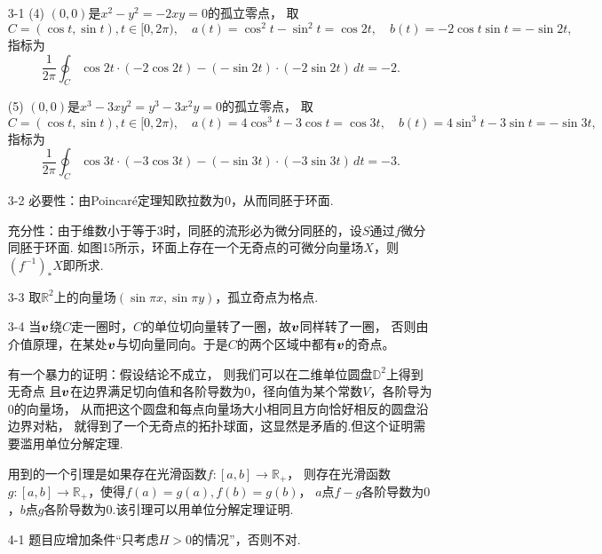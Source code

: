 \begin{itemize}
\item[3-1](4) $(0,0)$是$x^2-y^2=-2xy=0$的孤立零点，
取$$C=(\cos t,\sin t),t\in[0,2\pi),
\quad a(t)=\cos^2t-\sin^2t=\cos 2t,\quad b(t)=-2\cos t\sin t=-\sin 2t,$$指标为
$$\frac{1}{2\pi}\oint_C \cos 2t\cdot(-2\cos 2t)-(-\sin 2t)\cdot(-2\sin 2t)\,dt=-2.$$

(5) $(0,0)$是$x^3-3xy^2=y^3-3x^2y=0$的孤立零点，
取$$C=(\cos t,\sin t),t\in[0,2\pi),
\quad a(t)=4\cos^3t-3\cos t=\cos 3t,\quad b(t)=4\sin^3t-3\sin t=-\sin 3t,$$指标为
$$\frac{1}{2\pi}\oint_C \cos 3t\cdot(-3\cos 3t)-(-\sin 3t)\cdot(-3\sin 3t)\,dt=-3.$$

\item[3-2] 必要性：由Poincaré定理知欧拉数为$0$，从而同胚于环面.

充分性：由于维数小于等于$3$时，同胚的流形必为微分同胚的，设$S$通过$f$微分同胚于环面.
如图15所示，环面上存在一个无奇点的可微分向量场$X$，则$(f^{-1})_*X$即所求.

\item[3-3] 取$\mathbb{R}^2$上的向量场$(\sin \pi x,\sin \pi y)$，孤立奇点为格点.

\item[3-4] 当$\boldsymbol{v}$绕$C$走一圈时，$C$的单位切向量转了一圈，故$\boldsymbol{v}$同样转了一圈，
否则由介值原理，在某处$\boldsymbol{v}$与切向量同向。于是$C$的两个区域中都有$\boldsymbol{v}$的奇点。

有一个暴力的证明：假设结论不成立，
则我们可以在二维单位圆盘$\mathbb{D}^2$上得到无奇点
且$\boldsymbol{v}$在边界满足切向值和各阶导数为$0$，径向值为某个常数$V$，各阶导为$0$的向量场，
从而把这个圆盘和每点向量场大小相同且方向恰好相反的圆盘沿边界对粘，
就得到了一个无奇点的拓扑球面，这显然是矛盾的.但这个证明需要滥用单位分解定理.

用到的一个引理是如果存在光滑函数$f:[a,b]\to\mathbb{R}_+$，
则存在光滑函数$g:[a,b]\to\mathbb{R}_+$，使得$f(a)=g(a),f(b)=g(b)$，
$a$点$f-g$各阶导数为$0$，$b$点$g$各阶导数为$0$.该引理可以用单位分解定理证明.

\item[4-1] 题目应增加条件``只考虑$H>0$的情况''，否则不对.


\end{itemize}
